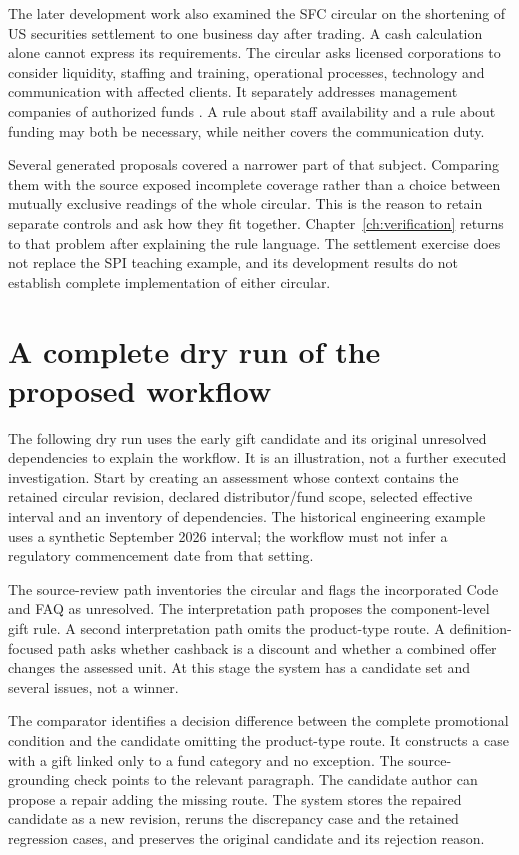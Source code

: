 \documentclass[12pt,a4paper,oneside,openany]{book}
\begin{document}
The later development work also examined the SFC circular on the shortening of
US securities settlement to one business day after trading. A cash calculation
alone cannot express its requirements. The circular asks licensed corporations
to consider liquidity, staffing and training, operational processes, technology
and communication with affected clients. It separately addresses management
companies of authorized funds \citep{sfctplusone2024}. A rule about staff
availability and a rule about funding may both be necessary, while neither
covers the communication duty.

Several generated proposals covered a narrower part of that subject. Comparing
them with the source exposed incomplete coverage rather than a choice between
mutually exclusive readings of the whole circular. This is the reason to retain
separate controls and ask how they fit together. Chapter~\ref{ch:verification}
returns to that problem after explaining the rule language. The settlement
exercise does not replace the SPI teaching example, and its development results
do not establish complete implementation of either circular.

\section{A complete dry run of the proposed workflow}
\label{merge:M02:07}

\label{sec:circular-dryrun}
The following dry run uses the early gift candidate and its original unresolved
dependencies to explain the workflow. It is an illustration, not a further
executed investigation. Start by creating an assessment whose context
contains the retained circular revision, declared distributor/fund scope,
selected effective interval and an inventory of dependencies. The historical
engineering example uses a synthetic September 2026 interval; the workflow must
not infer a regulatory commencement date from that setting.

The source-review path inventories the circular and flags the incorporated Code
and FAQ as unresolved. The interpretation path proposes the component-level
gift rule. A second interpretation path omits the product-type route. A
definition-focused path asks whether cashback is a discount and whether a
combined offer changes the assessed unit. At this stage the system has a
candidate set and several issues, not a winner.

The comparator identifies a decision difference between the complete promotional
condition and the candidate omitting the product-type route. It constructs a
case with a gift linked only to a fund category and no exception. The
source-grounding check points to the relevant paragraph. The candidate author
can propose a repair adding the missing route. The system stores the repaired
candidate as a new revision, reruns the discrepancy case and the retained
regression cases, and preserves the original candidate and its rejection reason.
\end{document}
